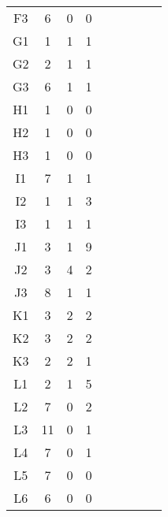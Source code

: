 \begin{center}
\begin{longtable}{ccccc|cccc}
    F3    & 6     & 0     & 0 \\
    G1    & 1     & 1     & 1 \\
    G2    & 2     & 1     & 1 \\
    G3    & 6     & 1     & 1 \\
    H1    & 1     & 0     & 0 \\
    H2    & 1     & 0     & 0 \\
    H3    & 1     & 0     & 0 \\
    I1    & 7     & 1     & 1 \\
    I2    & 1     & 1     & 3 \\
    I3    & 1     & 1     & 1 \\
    J1    & 3     & 1     & 9 \\
    J2    & 3     & 4     & 2 \\
    J3    & 8     & 1     & 1 \\
    K1    & 3     & 2     & 2 \\
    K2    & 3     & 2     & 2 \\
    K3    & 2     & 2     & 1 \\
    L1    & 2     & 1     & 5 \\
    L2    & 7     & 0     & 2 \\
    L3    & 11    & 0     & 1 \\
    L4    & 7     & 0     & 1 \\
    L5    & 7     & 0     & 0 \\
    L6    & 6     & 0     & 0 \\

\end{longtable}
\end{center}

